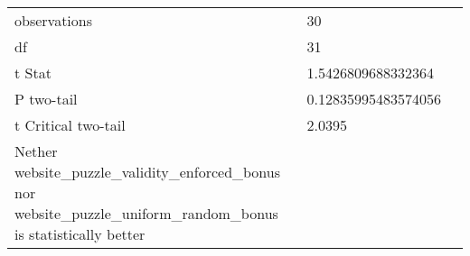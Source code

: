 \documentclass[11pt]{article}
\begin{document}
\begin{table}[]
{\begin{tabular}{|l|l|l|}
                                                                                                                        &                                         &                                            \\ \hline
    observations                                                                                                          & 30                                      &                                            \\ \hline
    df                                                                                                                    & 31                                      &                                            \\ \hline
    t Stat                                                                                                                & 1.5426809688332364                      &                                            \\ \hline
    P two-tail                                                                                                            & 0.12835995483574056                     &                                            \\ \hline
    t Critical two-tail                                                                                                   & 2.0395                                  &                                            \\ \hline
    Nether website\_puzzle\_validity\_enforced\_bonus nor website\_puzzle\_uniform\_random\_bonus is statistically better &                                         &                                            \\ \hline
    \end{tabular}%
    }
\end{table}
\end{document}

